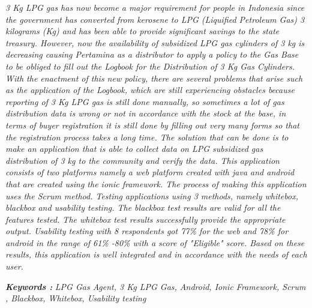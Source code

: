 \begin{abstracteng}
\textit{3 Kg LPG gas has now become a major requirement for people in Indonesia since the government has converted from kerosene to LPG (Liquified Petroleum Gas) 3 kilograms (Kg) and has been able to provide significant savings to the state treasury. However, now the availability of subsidized LPG gas cylinders of 3 kg is decreasing causing Pertamina as a distributor to apply a policy to the Gas Base to be obliged to fill out the Logbook for the Distribution of 3 Kg Gas Cylinders. With the enactment of this new policy, there are several problems that arise such as the application of the Logbook, which are still experiencing obstacles because reporting of 3 Kg LPG gas is still done manually, so sometimes a lot of gas distribution data is wrong or not in accordance with the stock at the base, in terms of buyer registration it is still done by filling out very many forms so that the registration process takes a long time. The solution that can be done is to make an application that is able to collect data on LPG subsidized gas distribution of 3 kg to the community and verify the data. This application consists of two platforms namely a web platform created with java and android that are created using the ionic framework. The process of making this application uses the Scrum method. Testing applications using 3 methods, namely whitebox, blackbox and usability testing. The blackbox test results are valid for all the features tested. The whitebox test results successfully provide the appropriate output. Usability testing with 8 respondents got 77\% for the web and 78\% for android in the range of 61\% -80\% with a score of "Eligible" score. Based on these results, this application is well integrated and in accordance with the needs of each user.}

\bigskip
\noindent
\textbf{\emph{Keywords :}} \textit{LPG Gas Agent, 3 Kg LPG Gas, Android, Ionic Framework, Scrum , Blackbox, Whitebox, Usability testing}
\end{abstracteng}